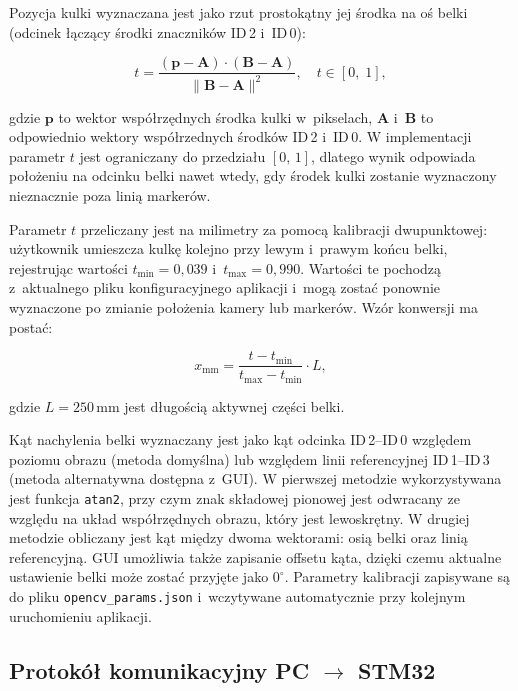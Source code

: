 Pozycja kulki wyznaczana jest jako rzut prostokątny jej środka na oś belki
(odcinek łączący środki znaczników ID\,2 i~ID\,0):

\begin{equation}
  t = \frac{(\mathbf{p} - \mathbf{A}) \cdot (\mathbf{B} - \mathbf{A})}
  {\|\mathbf{B} - \mathbf{A}\|^2},
  \quad t \in [0,\;1],
  \label{eq:rzut}
\end{equation}

gdzie $\mathbf{p}$ to wektor współrzędnych środka kulki w~pikselach,
$\mathbf{A}$ i~$\mathbf{B}$ to odpowiednio wektory współrzednych środków ID\,2 i~ID\,0.
W implementacji parametr $t$ jest ograniczany do przedziału $[0,\,1]$, dlatego
wynik odpowiada położeniu na odcinku belki nawet wtedy, gdy środek kulki zostanie
wyznaczony nieznacznie poza linią markerów.

Parametr $t$ przeliczany jest na milimetry za pomocą kalibracji dwupunktowej:
użytkownik umieszcza kulkę kolejno przy lewym i~prawym końcu belki,
rejestrując wartości $t_{\min} = 0{,}039$ i~$t_{\max} = 0{,}990$.
Wartości te pochodzą z~aktualnego pliku konfiguracyjnego aplikacji i~mogą zostać
ponownie wyznaczone po zmianie położenia kamery lub markerów. Wzór konwersji ma
postać:

\begin{equation}
  x_{\mathrm{mm}} =
  \frac{t - t_{\min}}{t_{\max} - t_{\min}} \cdot L,
  \label{eq:kalibracja}
\end{equation}

gdzie $L = 250\,\mathrm{mm}$ jest długością aktywnej części belki.

Kąt nachylenia belki wyznaczany jest jako kąt odcinka ID\,2--ID\,0
względem poziomu obrazu (metoda domyślna) lub względem linii referencyjnej
ID\,1--ID\,3 (metoda alternatywna dostępna z~GUI).
W pierwszej metodzie wykorzystywana jest funkcja \texttt{atan2}, przy czym znak
składowej pionowej jest odwracany ze względu na układ współrzędnych obrazu, który jest lewoskrętny. W drugiej metodzie obliczany jest kąt między dwoma wektorami:
osią belki oraz linią referencyjną. GUI umożliwia także zapisanie offsetu kąta,
dzięki czemu aktualne ustawienie belki może zostać przyjęte jako $0^{\circ}$.
Parametry kalibracji zapisywane są do pliku \texttt{opencv\_params.json}
i~wczytywane automatycznie przy kolejnym uruchomieniu aplikacji.

\subsection{\texorpdfstring{Protokół komunikacyjny PC $\to$ STM32}{Protokół komunikacyjny PC do STM32}}

